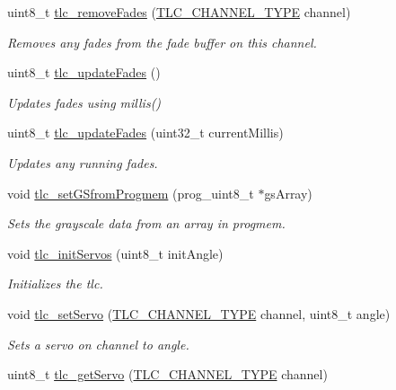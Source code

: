 \begin{DoxyCompactItemize}
uint8\+\_\+t \hyperlink{group__ExtendedFunctions_ga262446811b33d3765bf9434bebb60cff}{tlc\+\_\+remove\+Fades} (\hyperlink{tlc__config_8h_ab23dc44a3be02131509f5ab61f68530e}{T\+L\+C\+\_\+\+C\+H\+A\+N\+N\+E\+L\+\_\+\+T\+Y\+PE} channel)
\begin{DoxyCompactList}\small\item\em Removes any fades from the fade buffer on this channel. \end{DoxyCompactList}\item 
uint8\+\_\+t \hyperlink{group__ExtendedFunctions_ga48d61decbeb32b4b31c0e82097e69577}{tlc\+\_\+update\+Fades} ()
\begin{DoxyCompactList}\small\item\em Updates fades using millis() \end{DoxyCompactList}\item 
uint8\+\_\+t \hyperlink{group__ExtendedFunctions_gaa3da29446480ef76d5c2a26ef97b1884}{tlc\+\_\+update\+Fades} (uint32\+\_\+t current\+Millis)
\begin{DoxyCompactList}\small\item\em Updates any running fades. \end{DoxyCompactList}\item 
void \hyperlink{group__ExtendedFunctions_gab61761323f7364b25d83c6e63711cd4b}{tlc\+\_\+set\+G\+Sfrom\+Progmem} (prog\+\_\+uint8\+\_\+t $\ast$gs\+Array)
\begin{DoxyCompactList}\small\item\em Sets the grayscale data from an array in progmem. \end{DoxyCompactList}\item 
void \hyperlink{group__ExtendedFunctions_gafda382e9cf45520a6a5d6ae866785db8}{tlc\+\_\+init\+Servos} (uint8\+\_\+t init\+Angle)
\begin{DoxyCompactList}\small\item\em Initializes the tlc. \end{DoxyCompactList}\item 
void \hyperlink{group__ExtendedFunctions_ga813d2236e395bc29a66908fd683f61fc}{tlc\+\_\+set\+Servo} (\hyperlink{tlc__config_8h_ab23dc44a3be02131509f5ab61f68530e}{T\+L\+C\+\_\+\+C\+H\+A\+N\+N\+E\+L\+\_\+\+T\+Y\+PE} channel, uint8\+\_\+t angle)
\begin{DoxyCompactList}\small\item\em Sets a servo on channel to angle. \end{DoxyCompactList}\item 
uint8\+\_\+t \hyperlink{group__ExtendedFunctions_ga8cac1e00c8fe44fdfe71ed7623440df2}{tlc\+\_\+get\+Servo} (\hyperlink{tlc__config_8h_ab23dc44a3be02131509f5ab61f68530e}{T\+L\+C\+\_\+\+C\+H\+A\+N\+N\+E\+L\+\_\+\+T\+Y\+PE} channel)

\end{DoxyCompactItemize}

